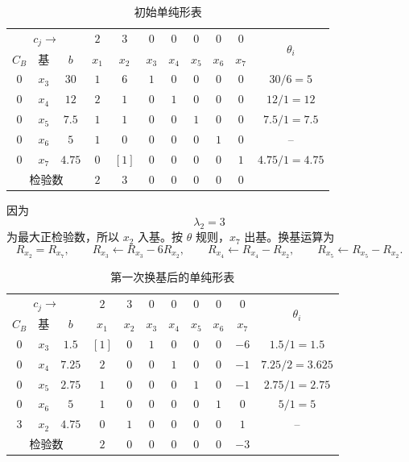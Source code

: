 ﻿\documentclass[UTF8,zihao=-4,fontset=none]{ctexart}
\begin{document}
\begin{table}[H]
\centering
{}
\setlength{\tabcolsep}{2.2pt}
\caption{初始单纯形表}
\begin{tabular}{ccccccccccc}
\toprule
\multicolumn{3}{c}{$c_j\rightarrow$} & \(2\) & \(3\) & \(0\) & \(0\) & \(0\) & \(0\) & \(0\) & \multirow{2}{*}{\(\theta_i\)}\\
\(C_B\) & 基 & \(b\) & \(x_1\) & \(x_2\) & \(x_3\) & \(x_4\) & \(x_5\) & \(x_6\) & \(x_7\) &\\
\midrule
\(0\) & \(x_3\) & \(30\)   & \(1\) & \(6\) & \(1\) & \(0\) & \(0\) & \(0\) & \(0\) & \(30/6=5\)\\
\(0\) & \(x_4\) & \(12\)   & \(2\) & \(1\) & \(0\) & \(1\) & \(0\) & \(0\) & \(0\) & \(12/1=12\)\\
\(0\) & \(x_5\) & \(7.5\)  & \(1\) & \(1\) & \(0\) & \(0\) & \(1\) & \(0\) & \(0\) & \(7.5/1=7.5\)\\
\(0\) & \(x_6\) & \(5\)    & \(1\) & \(0\) & \(0\) & \(0\) & \(0\) & \(1\) & \(0\) & --\\
\(0\) & \(x_7\) & \(4.75\) & \(0\) & \([1]\) & \(0\) & \(0\) & \(0\) & \(0\) & \(1\) & \(4.75/1=4.75\)\\
\multicolumn{3}{c}{检验数} & \(2\) & \(3\) & \(0\) & \(0\) & \(0\) & \(0\) & \(0\) &\\
\bottomrule
\end{tabular}
\end{table}

因为
\[
    \lambda_2=3
\]
为最大正检验数，所以 \(x_2\) 入基。按 \(\theta\) 规则，\(x_7\) 出基。换基运算为
\[
    R_{x_2}=R_{x_7},\qquad
    R_{x_3}\leftarrow R_{x_3}-6R_{x_2},\qquad
    R_{x_4}\leftarrow R_{x_4}-R_{x_2},\qquad
    R_{x_5}\leftarrow R_{x_5}-R_{x_2}.
\]

\begin{table}[H]
\centering
{}
\setlength{\tabcolsep}{2.2pt}
\caption{第一次换基后的单纯形表}
\begin{tabular}{ccccccccccc}
\toprule
\multicolumn{3}{c}{$c_j\rightarrow$} & \(2\) & \(3\) & \(0\) & \(0\) & \(0\) & \(0\) & \(0\) & \multirow{2}{*}{\(\theta_i\)}\\
\(C_B\) & 基 & \(b\) & \(x_1\) & \(x_2\) & \(x_3\) & \(x_4\) & \(x_5\) & \(x_6\) & \(x_7\) &\\
\midrule
\(0\) & \(x_3\) & \(1.5\)  & \([1]\) & \(0\) & \(1\) & \(0\) & \(0\) & \(0\) & \(-6\) & \(1.5/1=1.5\)\\
\(0\) & \(x_4\) & \(7.25\) & \(2\) & \(0\) & \(0\) & \(1\) & \(0\) & \(0\) & \(-1\) & \(7.25/2=3.625\)\\
\(0\) & \(x_5\) & \(2.75\) & \(1\) & \(0\) & \(0\) & \(0\) & \(1\) & \(0\) & \(-1\) & \(2.75/1=2.75\)\\
\(0\) & \(x_6\) & \(5\)    & \(1\) & \(0\) & \(0\) & \(0\) & \(0\) & \(1\) & \(0\) & \(5/1=5\)\\
\(3\) & \(x_2\) & \(4.75\) & \(0\) & \(1\) & \(0\) & \(0\) & \(0\) & \(0\) & \(1\) & --\\
\multicolumn{3}{c}{检验数} & \(2\) & \(0\) & \(0\) & \(0\) & \(0\) & \(0\) & \(-3\) &\\
\bottomrule
\end{tabular}
\end{table}
\end{document}

